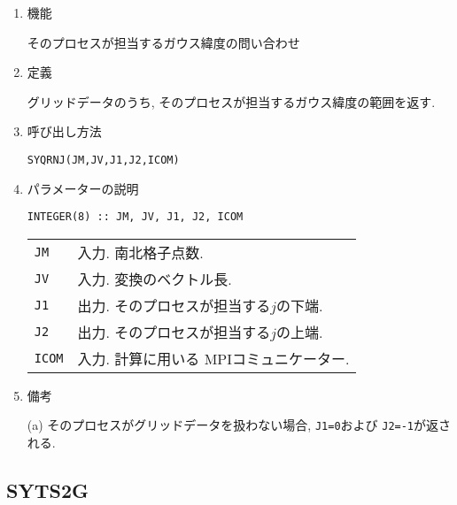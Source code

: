 \documentclass[a4j]{jsarticle}
\begin{document}
\begin{enumerate}

\item 機能 

そのプロセスが担当するガウス緯度の問い合わせ

\item 定義

グリッドデータのうち, そのプロセスが担当するガウス緯度の範囲を返す.

\item 呼び出し方法 
    
\texttt{SYQRNJ(JM,JV,J1,J2,ICOM)}
  
\item パラメーターの説明

\begin{verbatim}
INTEGER(8) :: JM, JV, J1, J2, ICOM
\end{verbatim}    

\begin{tabular}{ll}
\texttt{JM} & 入力. 南北格子点数.\\
\texttt{JV} & 入力. 変換のベクトル長.\\
\texttt{J1} & 出力. そのプロセスが担当する$j$の下端.\\
\texttt{J2} & 出力. そのプロセスが担当する$j$の上端.\\
\texttt{ICOM} & 入力. 計算に用いる MPIコミュニケーター.
\end{tabular}

\item 備考

(a) そのプロセスがグリッドデータを扱わない場合, \texttt{J1=0}および
\texttt{J2=-1}が返される.

\end{enumerate}


\subsection{SYTS2G}
\end{document}
